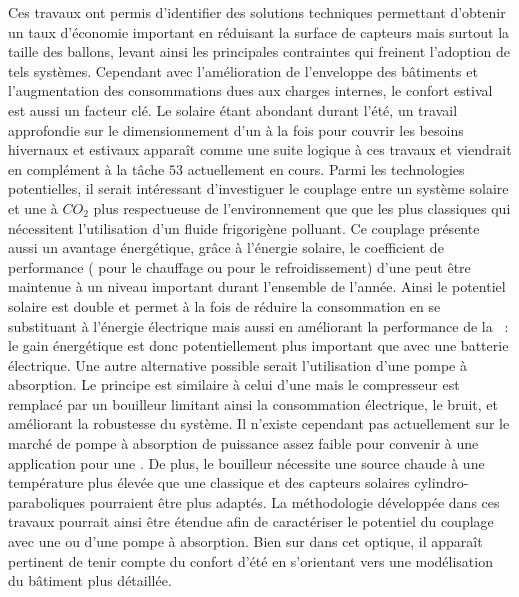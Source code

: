 Ces travaux ont permis d’identifier des solutions techniques permettant d’obtenir un taux
d’économie important en réduisant la surface de capteurs mais surtout la taille des
ballons, levant ainsi les principales contraintes qui freinent l’adoption de tels
systèmes. Cependant avec l’amélioration de l’enveloppe des bâtiments et l’augmentation des
consommations dues aux charges internes, le confort estival est aussi un facteur clé. Le
solaire étant abondant durant l’été, un travail approfondie sur le dimensionnement d’un
 à la fois pour couvrir les besoins hivernaux et estivaux apparaît comme une suite
logique à ces travaux et viendrait en complément à la tâche $53$ actuellement en cours.
Parmi les technologies potentielles, il serait intéressant d’investiguer le couplage entre
un système solaire et une  à $CO_{2}$ plus respectueuse de l’environnement que
que les  plus classiques qui nécessitent l’utilisation d’un fluide frigorigène
polluant. Ce couplage présente aussi un avantage énergétique, grâce à l’énergie solaire,
le coefficient de performance ( pour le chauffage ou  pour le
refroidissement) d’une  peut être maintenue à un niveau important durant
l’ensemble de l’année. Ainsi le potentiel solaire est double et permet à la fois de
réduire la consommation en se substituant à l’énergie électrique mais aussi en améliorant
la performance de la ~: le gain énergétique est donc potentiellement plus
important que avec une batterie électrique. Une autre alternative possible serait
l’utilisation d’une pompe à absorption. Le principe est similaire à celui d’une 
mais le compresseur est remplacé par un bouilleur limitant ainsi la consommation
électrique, le bruit, et améliorant la robustesse du système. Il n’existe cependant pas
actuellement sur le marché de pompe à absorption de puissance assez faible pour convenir à
une application pour une . De plus, le bouilleur nécessite une source chaude à
une température plus élevée que une  classique et des capteurs solaires
cylindro-paraboliques pourraient être plus adaptés. La méthodologie développée dans ces travaux
pourrait ainsi être étendue afin de caractériser le potentiel du couplage avec une
 ou d’une pompe à absorption. Bien sur dans cet optique, il apparaît pertinent de
tenir compte du confort d’été en s’orientant vers une modélisation du bâtiment plus
détaillée.
